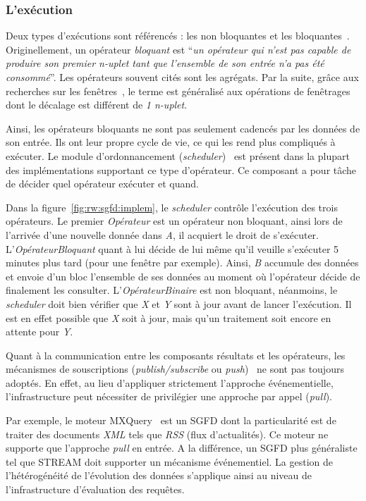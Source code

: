 \subsubsection{L'exécution}
Deux types d'exécutions sont référencés : les non bloquantes et les bloquantes~\cite{Babcock:issues}. Originellement, un opérateur \textit{bloquant} est \enquote{\it un opérateur qui n'est pas capable de produire son premier n-uplet tant que l'ensemble de son entrée n'a pas été consommé}. Les opérateurs souvent cités sont les agrégats. Par la suite, grâce aux recherches sur les fenêtres~\cite{Maier:semantics}, le terme est généralisé aux opérations de fenêtrages dont le décalage est différent de \textit{1 n-uplet}.

Ainsi, les opérateurs bloquants ne sont pas seulement cadencés par les données de son entrée. Ils ont leur propre cycle de vie, ce qui les rend plus compliqués à exécuter. Le module d'ordonnancement (\textit{scheduler})~\cite{Carney:scheduling} est présent dans la plupart des implémentations supportant ce type d'opérateur. Ce composant a pour tâche de décider quel opérateur exécuter et quand.

Dans la figure~\ref{fig:rw:sgfd:implem}, le \textit{scheduler} contrôle l'exécution des trois opérateurs. Le premier \textit{Opérateur} est un opérateur non bloquant, ainsi lors de l'arrivée d'une nouvelle donnée dans \textit{A}, il acquiert le droit de s'exécuter. L'\textit{OpérateurBloquant} quant à lui décide de lui même qu'il veuille s'exécuter 5 minutes plus tard (pour une fenêtre par exemple). Ainsi, \textit{B} accumule des données et envoie d'un bloc l'ensemble de ses données au moment où l'opérateur décide de finalement les consulter. L'\textit{OpérateurBinaire} est non bloquant, néanmoins, le \textit{scheduler} doit bien vérifier que \textit{X} et \textit{Y} sont à jour avant de lancer l'exécution. Il est en effet possible que \textit{X} soit à jour, mais qu'un traitement soit encore en attente pour \textit{Y}.

Quant à la communication entre les composants résultats et les opérateurs, les mécanismes de souscriptions (\textit{publish/subscribe} ou \textit{push})~\cite{Eugster:publishsubscribe} ne sont pas toujours adoptés. En effet, au lieu d'appliquer strictement l'approche événementielle, l'infrastructure peut nécessiter de privilégier une approche par appel (\textit{pull}).

Par exemple, le moteur MXQuery~\cite{Botan:MXQuery} est un SGFD dont la particularité est de traiter des documents \textit{XML} tels que \textit{RSS} (flux d'actualités). Ce moteur ne supporte que l'approche \textit{pull} en entrée. A la différence, un SGFD plus généraliste tel que STREAM doit supporter un mécanisme événementiel. La gestion de l'hétérogénéité de l'évolution des données s'applique ainsi au niveau de l'infrastructure d'évaluation des requêtes.

